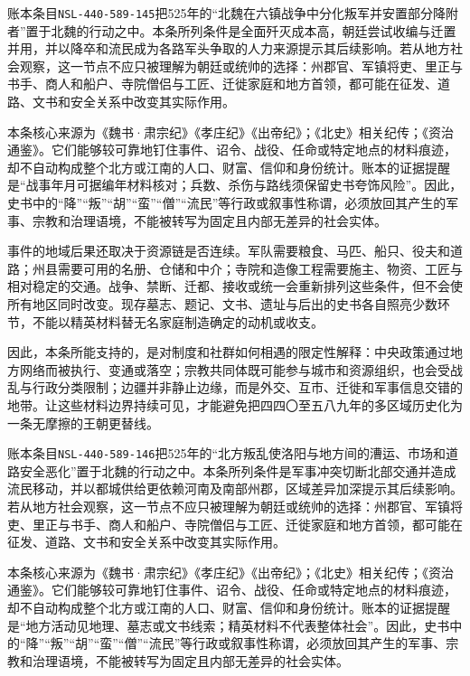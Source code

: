 账本条目\texttt{NSL-440-589-145}把525年的“北魏在六镇战争中分化叛军并安置部分降附者”置于北魏的行动之中。本条所列条件是全面歼灭成本高，朝廷尝试收编与迁置并用，并以降卒和流民成为各路军头争取的人力来源提示其后续影响。若从地方社会观察，这一节点不应只被理解为朝廷或统帅的选择：州郡官、军镇将吏、里正与书手、商人和船户、寺院僧侣与工匠、迁徙家庭和地方首领，都可能在征发、道路、文书和安全关系中改变其实际作用。

本条核心来源为《魏书·肃宗纪》《孝庄纪》《出帝纪》；《北史》相关纪传；《资治通鉴》。它们能够较可靠地钉住事件、诏令、战役、任命或特定地点的材料痕迹，却不自动构成整个北方或江南的人口、财富、信仰和身份统计。账本的证据提醒是“战事年月可据编年材料核对；兵数、杀伤与路线须保留史书夸饰风险”。因此，史书中的“降”“叛”“胡”“蛮”“僧”“流民”等行政或叙事性称谓，必须放回其产生的军事、宗教和治理语境，不能被转写为固定且内部无差异的社会实体。

事件的地域后果还取决于资源链是否连续。军队需要粮食、马匹、船只、役夫和道路；州县需要可用的名册、仓储和中介；寺院和造像工程需要施主、物资、工匠与相对稳定的交通。战争、禁断、迁都、接收或统一会重新排列这些条件，但不会使所有地区同时改变。现存墓志、题记、文书、遗址与后出的史书各自照亮少数环节，不能以精英材料替无名家庭制造确定的动机或收支。

因此，本条所能支持的，是对制度和社群如何相遇的限定性解释：中央政策通过地方网络而被执行、变通或落空；宗教共同体既可能参与城市和资源组织，也会受战乱与行政分类限制；边疆并非静止边缘，而是外交、互市、迁徙和军事信息交错的地带。让这些材料边界持续可见，才能避免把四四〇至五八九年的多区域历史化为一条无摩擦的王朝更替线。

账本条目\texttt{NSL-440-589-146}把525年的“北方叛乱使洛阳与地方间的漕运、市场和道路安全恶化”置于北魏的行动之中。本条所列条件是军事冲突切断北部交通并造成流民移动，并以都城供给更依赖河南及南部州郡，区域差异加深提示其后续影响。若从地方社会观察，这一节点不应只被理解为朝廷或统帅的选择：州郡官、军镇将吏、里正与书手、商人和船户、寺院僧侣与工匠、迁徙家庭和地方首领，都可能在征发、道路、文书和安全关系中改变其实际作用。

本条核心来源为《魏书·肃宗纪》《孝庄纪》《出帝纪》；《北史》相关纪传；《资治通鉴》。它们能够较可靠地钉住事件、诏令、战役、任命或特定地点的材料痕迹，却不自动构成整个北方或江南的人口、财富、信仰和身份统计。账本的证据提醒是“地方活动见地理、墓志或文书线索；精英材料不代表整体社会”。因此，史书中的“降”“叛”“胡”“蛮”“僧”“流民”等行政或叙事性称谓，必须放回其产生的军事、宗教和治理语境，不能被转写为固定且内部无差异的社会实体。


